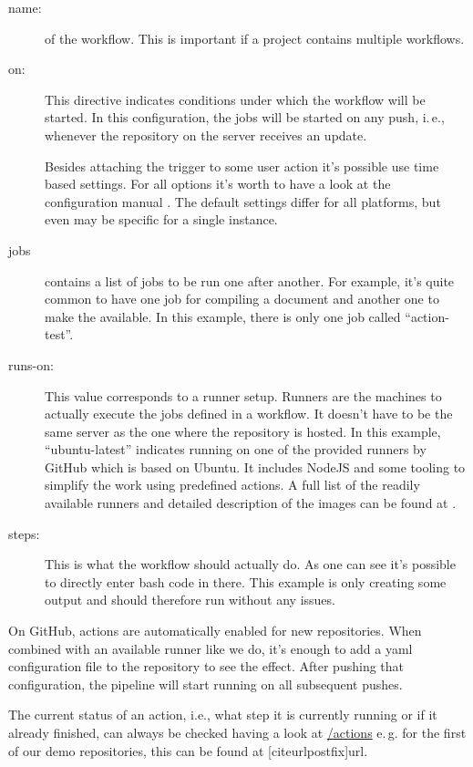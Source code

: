 \documentclass[final]{ltugboat}
\begin{document}
\begin{description}
\item[name:] of the workflow.
This is important if a project contains multiple workflows.

\item[on:] This directive indicates conditions under which the workflow will be started.
In this configuration, the jobs will be started on any push, i.\,e., whenever the repository on the server receives an update.

Besides attaching the trigger to some user action it's possible use time based settings.
For all options it's worth to have a look at the configuration manual \cite{github-actions-ref}.
The default settings differ for all platforms, but even may be specific for a single instance.

\item[jobs] contains a list of jobs to be run one after another.
For example, it's quite common to have one job for compiling a document and another one to make the  available.
In this example, there is only one job called \enquote{action-test}.

\item[runs-on:] This value corresponds to a runner setup.
Runners are the machines to actually execute the jobs defined in a workflow.
It doesn't have to be the same server as the one where the repository is hosted.
In this example, \enquote{ubuntu-latest} indicates running on one of the provided runners by GitHub which is based on Ubuntu.
It includes NodeJS and some tooling to simplify the work using predefined actions.
A full list of the readily available runners and detailed description of the images can be found at \cite{github-hosted-runners}.

\item[steps:] This is what the workflow should actually do.
As one can see it's possible to directly enter bash code in there.
This example is only creating some output and should therefore run without any issues.
\end{description}

On GitHub, actions are automatically enabled for new repositories.
When combined with an available runner like we do, it's enough to add a yaml configuration file to the repository to see the effect.
After pushing that configuration, the pipeline will start running on all subsequent pushes.

The current status of an action, i.e., what step it is currently running or if it already finished, can always be checked having a look at
\url{/actions} e.\,g. for the first of our demo repositories, this can be found at
{[citeurlpostfix]{url}}.
\end{document}
